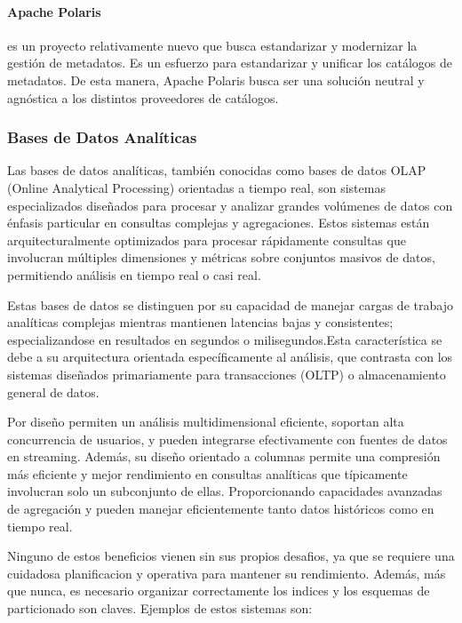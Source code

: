 \paragraph{Apache Polaris} es un proyecto relativamente nuevo que busca estandarizar y modernizar la gestión de metadatos. Es un esfuerzo para estandarizar y unificar los catálogos de metadatos.
De esta manera, Apache Polaris busca ser una solución neutral y agnóstica a los distintos proveedores de catálogos.  

\newpage

\subsubsection{Bases de Datos Analíticas}

Las bases de datos analíticas, también conocidas como bases de datos OLAP (Online Analytical Processing) orientadas a tiempo real, 
son sistemas especializados diseñados para procesar y analizar grandes volúmenes de datos con énfasis particular en consultas complejas y agregaciones. 
Estos sistemas están arquitecturalmente optimizados para procesar rápidamente consultas que involucran múltiples dimensiones y métricas sobre conjuntos masivos de datos, 
permitiendo análisis en tiempo real o casi real. \newline

Estas bases de datos se distinguen por su capacidad de manejar cargas de trabajo analíticas complejas mientras mantienen latencias bajas y consistentes; 
especializandose en resultados en segundos o milisegundos.Esta característica se debe a su arquitectura orientada específicamente al análisis, 
que contrasta con los sistemas diseñados primariamente para transacciones (OLTP) o almacenamiento general de datos.\newline

Por diseño permiten un análisis multidimensional eficiente, soportan alta concurrencia de usuarios, y pueden integrarse efectivamente con fuentes de datos en streaming.
Además, su diseño orientado a columnas permite una compresión más eficiente y mejor rendimiento en consultas analíticas que típicamente involucran solo un subconjunto de ellas. 
Proporcionando capacidades avanzadas de agregación y pueden manejar eficientemente tanto datos históricos como en tiempo real.\newline

Ninguno de estos beneficios vienen sin sus propios desafios, ya que se requiere una cuidadosa planificacion y operativa para mantener su rendimiento.
Además, más que nunca, es necesario organizar correctamente los indices y los esquemas de particionado son claves.\newline
\newpage
Ejemplos de estos sistemas son:

